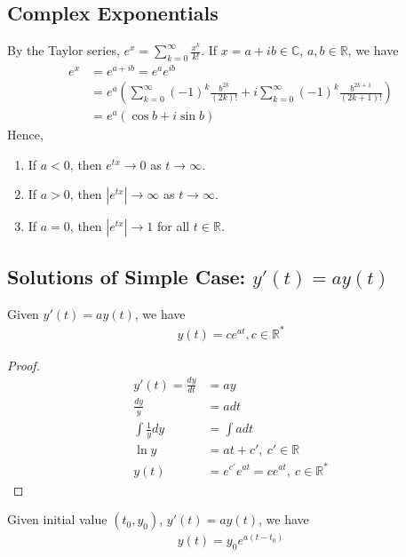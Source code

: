 \documentclass[11pt]{elegantbook}
\begin{document}
\subsection{Complex Exponentials}
By the Taylor series, $e^x=\sum_{k=0}^\infty\frac{x^k}{k!}$. If $x=a+ib\in \mathbb{C}$, $a,b\in \mathbb{R}$, we have
\begin{equation}
    \begin{aligned}
        e^{x}&=e^{a+ib}=e^a e^{ib}\\
        &=e^a\left(\sum_{k=0}^\infty(-1)^k\frac{b^{2k}}{(2k)!}+i\sum_{k=0}^\infty(-1)^k\frac{b^{2k+1}}{(2k+1)!}\right)\\
        &=e^a(\cos b + i\sin b)
    \end{aligned}
    \nonumber
\end{equation}
Hence,
\begin{enumerate}
    \item If $a < 0$, then $e^{tx} \rightarrow  0$ as $t \rightarrow \infty$.
    \item If $a > 0$, then $|e^{tx}| \rightarrow  \infty$ as $t \rightarrow \infty$.
    \item If $a = 0$, then $|e^{tx}| \rightarrow  1$ for all $t\in \mathbb{R}$.
\end{enumerate}

\subsection{Solutions of Simple Case: $y'(t)=ay(t)$}
\begin{proposition}
    Given $y'(t)=ay(t)$, we have
    \begin{equation}
        \begin{aligned}
            y(t)=c e^{at}, c\in \mathbb{R}^*
        \end{aligned}
        \nonumber
    \end{equation}
\end{proposition}
\begin{proof}
    \begin{equation}
        \begin{aligned}
            y'(t)=\frac{dy}{dt}&=a y\\
            \frac{dy}{y}&=a dt\\
            \int \frac{1}{y} dy &= \int a dt\\
            \ln y &= at +c',\ c'\in \mathbb{R}\\
            y(t)&=e^{c'} e^{at}=c e^{at},\ c\in \mathbb{R}^*
        \end{aligned}
        \nonumber
    \end{equation}
\end{proof}
\begin{proposition}\label{proposition:Simple Case with Initial Value}
    Given initial value $(t_0,y_0)$, $y'(t)=a y(t)$, we have
    \begin{equation}
        \begin{aligned}
            y(t)=y_0 e^{a(t-t_0)}
        \end{aligned}
        \nonumber
    \end{equation}
\end{proposition}
\end{document}
